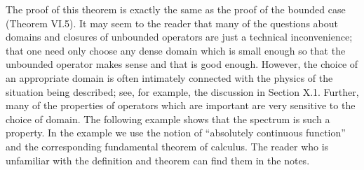 The proof of this theorem is exactly the same as the proof of the bounded
case (Theorem VI.5).
It may seem to the reader that many of the questions about domains and closures of unbounded operators are just a technical inconvenience; that one need only choose any dense domain which is small enough so that the unbounded operator makes sense and that is good enough. However, the choice of an appropriate domain is often intimately connected with the physics of the situation being described; see, for example, the discussion in Section X.1.
Further, many of the properties of operators which are important are very sensitive to the choice of domain. The following example shows that the spectrum is such a property. In the example we use the notion of \enquote{absolutely continuous function} and the corresponding fundamental theorem of calculus. The reader who is unfamiliar with the definition and theorem can find them in the notes.

